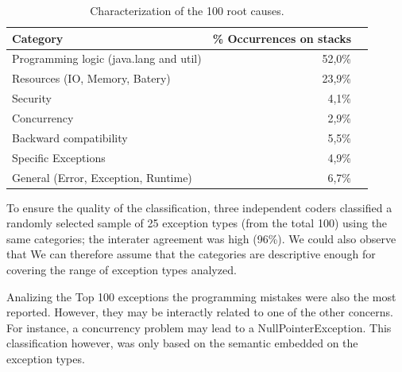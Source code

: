 \documentclass[conference]{IEEEtran}
\begin{document}
\begin{table}
  \centering
  \begin{tabular}{lrr}
    \hline
    \bfseries{Category} &  \bfseries{\% Occurrences on stacks} \\
    \hline
      Programming logic (java.lang and util) &  52,0\%\\ 
      Resources (IO, Memory, Batery)       &   23,9\% \\ 
      Security                               &  4,1\%\\  
      Concurrency                            &  2,9\% \\ 
      Backward compatibility                 & 5,5\% \\ 
      Specific Exceptions               &  4,9\%\\ 
      General (Error, Exception, Runtime)    &  6,7\%\\
  \end{tabular}
  \caption{Characterization of the 100 root causes.}
  \label{tab:tophundrend}
\end{table}

To ensure the quality of the classification, three independent coders classified a randomly selected
sample of 25 exception types (from the total 100) using the same categories;
the interater agreement was high (96\%). We could also observe that
We can therefore assume that the categories are descriptive 
enough for covering the range of exception types analyzed.

Analizing the Top 100 exceptions the programming mistakes
were also the most reported. However, they may be interactly related 
to one of the other concerns. For  instance, a concurrency problem may 
lead to a NullPointerException. This classification however, 
was only based on the semantic embedded  on the exception types.

\noindent {}



\end{document}
